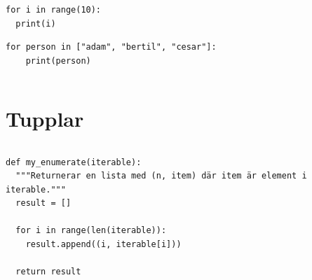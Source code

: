 \begin{frame}[fragile]
  \begin{example}
    \begin{verbatim}
for i in range(10):
  print(i)
    \end{verbatim}
  \end{example}
\end{frame}

\begin{frame}[fragile]
  \begin{example}
    \begin{verbatim}
for person in ["adam", "bertil", "cesar"]:
    print(person)
    \end{verbatim}
  \end{example}
\end{frame}

\begin{frame}[fragile]
  \begin{example}
    \inputminted{python}{examples/phone-for.py}
  \end{example}
\end{frame}



\section{Tupplar}

\begin{frame}[fragile]
  \begin{example}[tuples.py]
    \inputminted{python}{examples/tuples.py}
  \end{example}

  \pause

  \begin{example}
    \begin{verbatim}
def my_enumerate(iterable):
  """Returnerar en lista med (n, item) där item är element i iterable."""
  result = []

  for i in range(len(iterable)):
    result.append((i, iterable[i]))

  return result
    \end{verbatim}
  \end{example}
\end{frame}

\begin{frame}[fragile]
  \begin{example}[fullname.py]
    \inputminted[firstline=3,lastline=7]{python}{examples/fullname.py}
  \end{example}

  \pause

  \begin{example}
    \inputminted[firstline=3,lastline=7,highlightlines=7]{python}{examples/fullname-alt.py}
  \end{example}
\end{frame}

